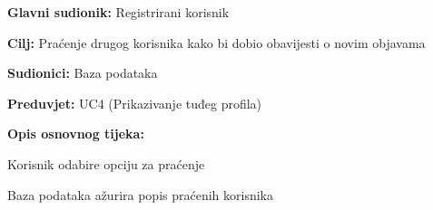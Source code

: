 					\noindent {}
					\begin{packed_item}
						
						\item \textbf{Glavni sudionik: }Registrirani korisnik
						\item \textbf{Cilj: }Praćenje drugog korisnika kako bi dobio obavijesti o novim objavama
						\item \textbf{Sudionici: }Baza podataka
						\item \textbf{Preduvjet: }UC4 (Prikazivanje tuđeg profila)
						\item \textbf{Opis osnovnog tijeka:}
						
						\item[] \begin{packed_enum}
							\item Korisnik odabire opciju za praćenje
							\item Baza podataka ažurira popis praćenih korisnika
						\end{packed_enum}
					\end{packed_item}
					
